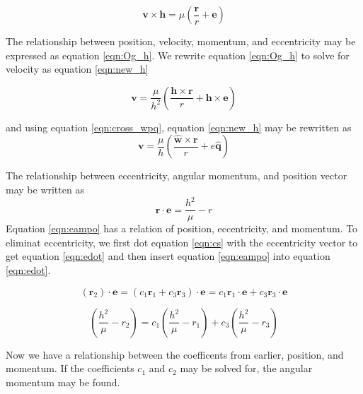\documentclass[12pt]{article}
\begin{document}
	\begin{equation}
	\mathbf { v } \times \mathbf { h } = \mu \left( \frac { \mathbf { r } } { r } + \mathbf { e } \right)
	\label{eqn:Og_h}
	\end{equation}
	
	The relationship between position, velocity, momentum, and eccentricity may be expressed as equation \ref{eqn:Og_h}. We rewrite equation \ref{eqn:Og_h} to solve for velocity as equation \ref{eqn:new_h}
	
	\begin{equation}
	\mathbf { v } = \frac { \mu } { h ^ { 2 } } \left( \frac { \mathbf { h } \times \mathbf { r } } { r } + \mathbf { h } \times \mathbf { e } \right)
	\label{eqn:new_h}
	\end{equation}

	
		and using equation \ref{eqn:cross_wpq}, equation \ref{eqn:new_h} may be rewritten as
	 \begin{equation}
	 \mathbf { v } = \frac { \mu } { h } \left( \frac { \hat { \mathbf { w } } \times \mathbf { r } } { r } + e \hat { \mathbf { q } } \right)
	 \label{eqn:almostDone}
	 \end{equation}
	 
	 The relationship between eccentricity, angular momentum, and position vector may be written as 
	 \begin{equation}
	 \mathbf { r } \cdot \mathbf { e } = \frac { h ^ { 2 } } { \mu } - r 
	 \label{eqn:eampo}
	 \end{equation}
	 Equation \ref{eqn:eampo} has a relation of position, eccentricity, and momentum. To eliminat eccentricity, we first dot equation \ref{eqn:cs} with the eccentricity vector to get equation \ref{eqn:edot} and then insert equation \ref{eqn:eampo} into equation \ref{eqn:edot}.
	 
	 \begin{equation}
	 \left(\mathbf{r}_2 \right)\cdot\mathbf{ e }= \left(c_1 \mathbf{ r }_1 + c_3 \mathbf{r}_3\right)\cdot\mathbf{ e }=c_1 \mathbf{ r }_1\cdot\mathbf{ e } + c_3 \mathbf{r}_3\cdot\mathbf{ e }
	 \label{eqn:edot}
	 \end{equation}
	 
	 
	 \begin{equation}
	 \left(\frac { h ^ { 2 } } { \mu } - r_2\right) =c_1 \left(\frac { h ^ { 2 } } { \mu } - r_1\right)  + c_3\left(\frac { h ^ { 2 } } { \mu } - r _3\right)
	 \label{eqn:edot2}
	 \end{equation}
	 
	 Now we have a relationship between the coefficents from earlier, position, and momentum. If the coefficients $c_1$ and $c_2$ may be solved for, the angular momentum may be found. 
	 
\end{document}

